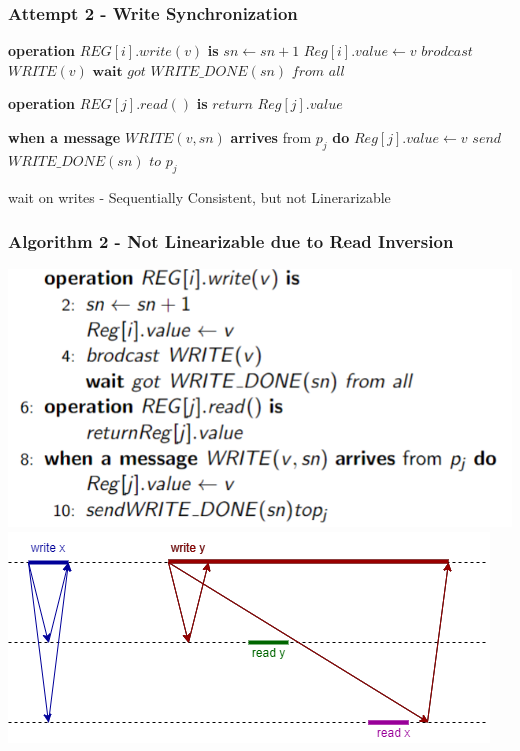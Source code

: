 \begin{frame}[fragile]
    \frametitle{Attempt 2 - Write Synchronization}
    \begin{algorithm}[H]
        \begin{algorithmic}[0]
            \STATE \textbf{operation} $REG[i].write(v)$ \textbf{is}
            \bindent
                \STATE $sn\leftarrow sn+1$
                \STATE $Reg[i].value \leftarrow v$
                \STATE $brodcast$ $WRITE(v)$
                \STATE $\textbf{wait}$ $got$ $WRITE\_DONE(sn)$ $from$ $all$
            \eindent

            \STATE \textbf{operation} $REG[j].read()$ \textbf{is}
            \bindent
                \STATE $return$ $Reg[j].value$
            \eindent
            
            \STATE \textbf{when a message} $WRITE(v, sn)$ \textbf{arrives} from $p_j$ \textbf{do}
            \bindent
                \STATE $Reg[j].value \leftarrow v$
                \STATE $send$ $WRITE\_DONE(sn)$ $to$ $p_j$
            \eindent

        \end{algorithmic}
        \caption{wait on writes - Sequentially Consistent, but not Linerarizable}
        \label{alg:seq}
    \end{algorithm}
\end{frame}

\begin{frame}
    \frametitle{Algorithm 2 - Not Linearizable due to Read Inversion}
    \begin{center}
        \includegraphics[scale=.63]{resources/alg2_src.png}
        \includegraphics[scale=.5]{resources/alg2_incorrectness.png}
    \end{center}
\end{frame}

